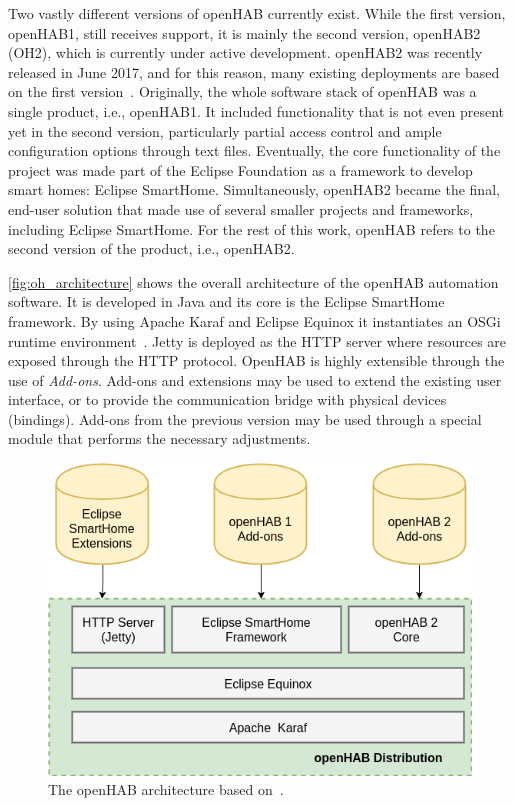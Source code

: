 \documentclass[12pt]{article}
\begin{document}
Two vastly different versions of openHAB currently exist. While the first version, openHAB1, still receives support, it is mainly the second version, openHAB2 (OH2), which is currently under active development. openHAB2 was recently released in June 2017, and for this reason, many existing deployments are based on the first version~\cite{openhab_01}. Originally, the whole software stack of openHAB was a single product, i.e., openHAB1. It included functionality that is not even present yet in the second version, particularly partial access control and ample configuration options through text files. Eventually, the core functionality of the project was made part of the Eclipse Foundation as a framework to develop smart homes: Eclipse SmartHome. Simultaneously, openHAB2 became the final, end-user solution that made use of several smaller projects and frameworks, including Eclipse SmartHome. For the rest of this work, openHAB refers to the second version of the product, i.e., openHAB2.

\autoref{fig:oh_architecture} shows the overall architecture of the openHAB automation software. It is developed in Java and its core is the Eclipse SmartHome framework. By using Apache Karaf and Eclipse Equinox it instantiates an OSGi runtime environment~\cite{openhab_02}. Jetty is deployed as the HTTP server where resources are exposed through the HTTP protocol. OpenHAB is highly extensible through the use of \emph{Add-ons}. Add-ons and extensions may be used to extend the existing user interface, or to provide the communication bridge with physical devices (bindings). Add-ons from the previous version may be used through a special module that performs the necessary adjustments. 

\begin{figure} [ht] 
\begin{center}
\includegraphics[width=\textwidth]{oh_architecture}
\caption{The openHAB architecture based on~\cite{openhab_02}.}
\label{fig:oh_architecture}
\end{center}
\end{figure}
\end{document}
